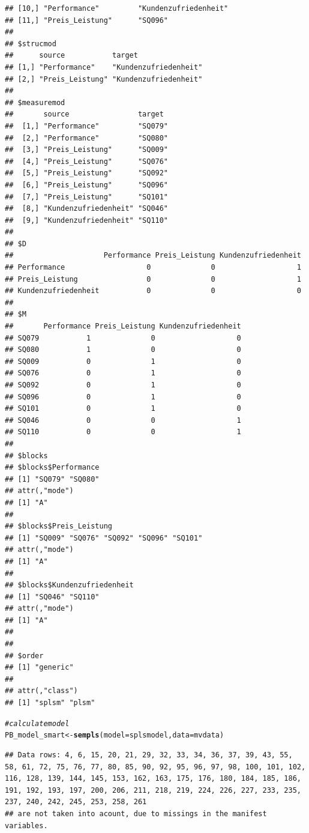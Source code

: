 \documentclass{article}\usepackage[]{graphicx}\usepackage[]{color}
\makeatletter
\newcommand{\hlcom}[1]{\textcolor[rgb]{0.678,0.584,0.686}{\textit{#1}}}%
\newcommand{\hlstd}[1]{\textcolor[rgb]{0.345,0.345,0.345}{#1}}%
\newcommand{\hlkwb}[1]{\textcolor[rgb]{0.69,0.353,0.396}{#1}}%
\newcommand{\hlkwc}[1]{\textcolor[rgb]{0.333,0.667,0.333}{#1}}%
\newcommand{\hlkwd}[1]{\textcolor[rgb]{0.737,0.353,0.396}{\textbf{#1}}}%
\newenvironment{kframe}{%
 \def\at@end@of@kframe{}%
 \ifinner\ifhmode%
  \def\at@end@of@kframe{\end{minipage}}%
  \begin{minipage}{\columnwidth}%
 \fi\fi%
 \def\FrameCommand##1{\hskip\@totalleftmargin \hskip-\fboxsep
 \colorbox{shadecolor}{##1}\hskip-\fboxsep
     \hskip-\linewidth \hskip-\@totalleftmargin \hskip\columnwidth}%
 \MakeFramed {\advance\hsize-\width
   \@totalleftmargin\z@ \linewidth\hsize
   \@setminipage}}%
 {\par\unskip\endMakeFramed%
 \at@end@of@kframe}
\newenvironment{knitrout}{}{} %
\makeatother
\begin{document}
\begin{knitrout}
\begin{kframe}
\begin{verbatim}
## [10,] "Performance"         "Kundenzufriedenheit"
## [11,] "Preis_Leistung"      "SQ096"              
## 
## $strucmod
##      source           target               
## [1,] "Performance"    "Kundenzufriedenheit"
## [2,] "Preis_Leistung" "Kundenzufriedenheit"
## 
## $measuremod
##       source                target 
##  [1,] "Performance"         "SQ079"
##  [2,] "Performance"         "SQ080"
##  [3,] "Preis_Leistung"      "SQ009"
##  [4,] "Preis_Leistung"      "SQ076"
##  [5,] "Preis_Leistung"      "SQ092"
##  [6,] "Preis_Leistung"      "SQ096"
##  [7,] "Preis_Leistung"      "SQ101"
##  [8,] "Kundenzufriedenheit" "SQ046"
##  [9,] "Kundenzufriedenheit" "SQ110"
## 
## $D
##                     Performance Preis_Leistung Kundenzufriedenheit
## Performance                   0              0                   1
## Preis_Leistung                0              0                   1
## Kundenzufriedenheit           0              0                   0
## 
## $M
##       Performance Preis_Leistung Kundenzufriedenheit
## SQ079           1              0                   0
## SQ080           1              0                   0
## SQ009           0              1                   0
## SQ076           0              1                   0
## SQ092           0              1                   0
## SQ096           0              1                   0
## SQ101           0              1                   0
## SQ046           0              0                   1
## SQ110           0              0                   1
## 
## $blocks
## $blocks$Performance
## [1] "SQ079" "SQ080"
## attr(,"mode")
## [1] "A"
## 
## $blocks$Preis_Leistung
## [1] "SQ009" "SQ076" "SQ092" "SQ096" "SQ101"
## attr(,"mode")
## [1] "A"
## 
## $blocks$Kundenzufriedenheit
## [1] "SQ046" "SQ110"
## attr(,"mode")
## [1] "A"
## 
## 
## $order
## [1] "generic"
## 
## attr(,"class")
## [1] "splsm" "plsm"
\end{verbatim}
\begin{alltt}
\hlcom{#calculate model}
\hlstd{PB_model_smart} \hlkwb{<-} \hlkwd{sempls}\hlstd{(}\hlkwc{model} \hlstd{= splsmodel,}\hlkwc{data} \hlstd{= mvdata)}
\end{alltt}
\begin{verbatim}
## Data rows: 4, 6, 15, 20, 21, 29, 32, 33, 34, 36, 37, 39, 43, 55, 58, 61, 72, 75, 76, 77, 80, 85, 90, 92, 95, 96, 97, 98, 100, 101, 102, 116, 128, 139, 144, 145, 153, 162, 163, 175, 176, 180, 184, 185, 186, 191, 192, 193, 197, 200, 206, 211, 218, 219, 224, 226, 227, 233, 235, 237, 240, 242, 245, 253, 258, 261 
## are not taken into acount, due to missings in the manifest variables.

\end{verbatim}
\end{kframe}
\end{knitrout}
\end{document}
